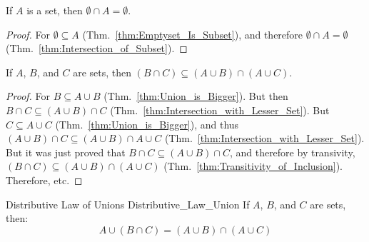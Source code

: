         \begin{theorem}
            If $A$ is a set, then $\emptyset\cap{A}=\emptyset$.
        \end{theorem}
        \begin{proof}
            For $\emptyset\subseteq{A}$ (Thm.~\ref{thm:Emptyset_Is_Subset}), and
            therefore $\emptyset\cap{A}=\emptyset$
            (Thm.~\ref{thm:Intersection_of_Subset}).
        \end{proof}
        \begin{theorem}
            \label{thm:First_Pseudo_Dist_Law_Union}%
            If $A$, $B$, and $C$ are sets, then
            $(B\cap{C})\subseteq(A\cup{B})\cap(A\cup{C})$.
        \end{theorem}
        \begin{proof}
            For $B\subseteq{A}\cup{B}$
            (Thm.~\ref{thm:Union_is_Bigger}). But then
            $B\cap{C}\subseteq(A\cup{B})\cap{C}$
            (Thm.~\ref{thm:Intersection_with_Lesser_Set}).
            But $C\subseteq{A}\cup{C}$
            (Thm.~\ref{thm:Union_is_Bigger}), and thus
            $(A\cup{B})\cap{C}%
            \subseteq(A\cup{B})\cap{A}\cup{C}$
            (Thm.~\ref{thm:Intersection_with_Lesser_Set}).
            But it was just proved that
            $B\cap{C}\subseteq(A\cup{B})\cap{C}$, and
            therefore by transivity,
            $(B\cap{C})\subseteq(A\cup{B})\cap(A\cup{C})$
            (Thm.~\ref{thm:Transitivity_of_Inclusion}).
            Therefore, etc.
        \end{proof}
        \begin{ftheorem}{Distributive Law of Unions}
            {Distributive_Law_Union}
            If $A$, $B$, and $C$ are sets, then:
            \begin{equation*}
                A\cup(B\cap{C})=(A\cup{B})\cap(A\cup{C})
            \end{equation*}
        \end{ftheorem}
